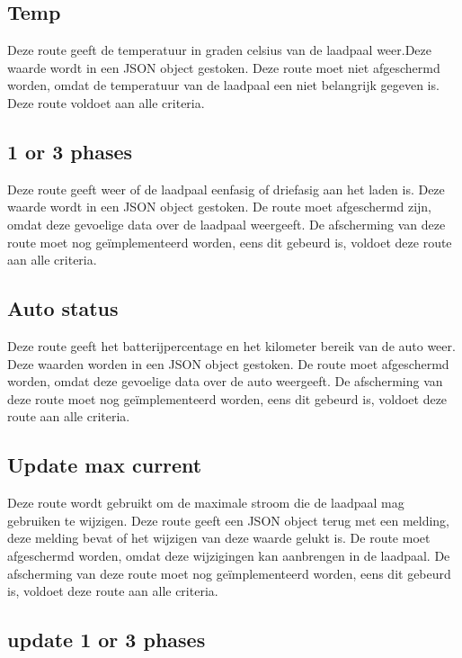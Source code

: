 \subsection{Temp}
\label{subsec:testresultaten-temp}

Deze route geeft de temperatuur in graden celsius van de laadpaal weer.Deze waarde wordt in een JSON object gestoken. Deze route moet niet afgeschermd worden, omdat de temperatuur van de laadpaal een niet belangrijk gegeven is. Deze route voldoet aan alle criteria.

\subsection{1 or 3 phases}
\label{subsec:testresultaten-1-or-3-phases}

Deze route geeft weer of de laadpaal eenfasig of driefasig aan het laden is. Deze waarde wordt in een JSON object gestoken. De route moet afgeschermd zijn, omdat deze gevoelige data over de laadpaal weergeeft. De afscherming van deze route moet nog geïmplementeerd worden, eens dit gebeurd is, voldoet deze route aan alle criteria.

\subsection{Auto status}
\label{subsec:testresultaten-auto-status}

Deze route geeft het batterijpercentage en het kilometer bereik van de auto weer. Deze waarden worden in een JSON object gestoken. De route moet afgeschermd worden, omdat deze gevoelige data over de auto weergeeft. De afscherming van deze route moet nog geïmplementeerd worden, eens dit gebeurd is, voldoet deze route aan alle criteria.

\subsection{Update max current}
\label{subsec:testresultaten-update-max-current}

Deze route wordt gebruikt om de maximale stroom die de laadpaal mag gebruiken te wijzigen. Deze route geeft een JSON object terug met een melding, deze melding bevat of het wijzigen van deze waarde gelukt is. De route moet afgeschermd worden, omdat deze wijzigingen kan aanbrengen in de laadpaal. De afscherming van deze route moet nog geïmplementeerd worden, eens dit gebeurd is, voldoet deze route aan alle criteria.

\subsection{update 1 or 3 phases}
\label{subsec:testresultaten-update-1-or-3-phases}

